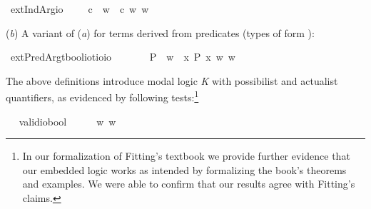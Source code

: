 \begin{isabellebody}
\isamarkupfalse%
\ extIndArg{\isacharcolon}{\isacharcolon}{\isachardoublequoteopen}{\isasymup}{\isasymlangle}{\isasymzero}{\isasymrangle}{\isasymRightarrow}{\isasymup}{\isasymzero}{\isasymRightarrow}io{\isachardoublequoteclose}\ {\isacharparenleft}\ {\isachardoublequoteopen}{\isasymdownharpoonleft}{\isachardoublequoteclose}{}{}{\isacharparenright}\ \ {\isachardoublequoteopen}{\isasymphi}\ {\isasymdownharpoonleft}c\ {\isasymequiv}\ {\isasymlambda}w{\isachardot}\ {\isasymphi}\ {\isacharparenleft}c\ w{\isacharparenright}\ w{\isachardoublequoteclose}%
\begin{isamarkuptext}%
(\emph{b}) A variant of (\emph{a}) for terms derived from predicates (types of form ):%
\end{isamarkuptext}\isamarkuptrue%
\isamarkupfalse%
\ extPredArg{\isacharcolon}{\isacharcolon}{\isachardoublequoteopen}{\isacharparenleft}{\isacharparenleft}{\isacharprime}t{\isasymRightarrow}bool{\isacharparenright}{\isasymRightarrow}io{\isacharparenright}{\isasymRightarrow}{\isacharparenleft}{\isacharprime}t{\isasymRightarrow}io{\isacharparenright}{\isasymRightarrow}io{\isachardoublequoteclose}\ {\isacharparenleft}\ {\isachardoublequoteopen}{\isasymdown}{\isachardoublequoteclose}\ {}{}{\isacharparenright}\isanewline
\ \ \ {\isachardoublequoteopen}{\isasymphi}\ {\isasymdown}P\ {\isasymequiv}\ {\isasymlambda}w{\isachardot}\ {\isasymphi}\ {\isacharparenleft}{\isasymlambda}x{\isachardot}\ P\ x\ w{\isacharparenright}\ w{\isachardoublequoteclose}%
\isamarkuptrue%
%
\begin{isamarkuptext}%
The above definitions introduce modal logic \emph{K} with possibilist and actualist quantifiers,
as evidenced by following tests:\footnote{In our formalization of Fitting's textbook \cite{AFP_FittingIHOML}
we provide further evidence that our embedded logic works as intended by formalizing the book's theorems and examples.
We were able to confirm that our results agree with Fitting's claims.}%
\end{isamarkuptext}\isamarkuptrue%
\ \isamarkupfalse%
\ valid{\isacharcolon}{\isacharcolon}{\isachardoublequoteopen}io{\isasymRightarrow}bool{\isachardoublequoteclose}\ {\isacharparenleft}{\isachardoublequoteopen}{\isasymlfloor}{\isacharunderscore}{\isasymrfloor}{\isachardoublequoteclose}{\isacharparenright}\ \ {\isachardoublequoteopen}{\isasymlfloor}{\isasympsi}{\isasymrfloor}\ {\isasymequiv}\ \ {\isasymforall}w{\isachardot}{\isacharparenleft}{\isasympsi}\ w{\isacharparenright}{\isachardoublequoteclose}\ %

\end{isabellebody}
